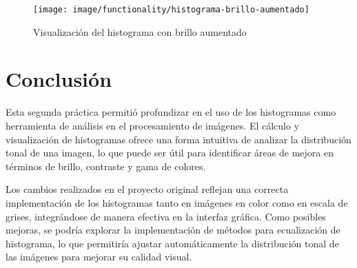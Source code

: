 \documentclass{report}
\begin{document}
  \begin{figure}[H]
    \centering
    \texttt{[image: image/functionality/histograma-brillo-aumentado]}
    \caption{Visualización del histograma con brillo aumentado}\label{fig:histograma-brillo-aumentado}
  \end{figure}

  \chapter{Conclusión}\label{ch:conclusion}
  Esta segunda práctica permitió profundizar en el uso de los histogramas como herramienta de análisis en el procesamiento de imágenes.
  El cálculo y visualización de histogramas ofrece una forma intuitiva de analizar la distribución tonal de una imagen, lo que puede ser útil para identificar áreas de mejora en términos de brillo, contraste y gama de colores.

  Los cambios realizados en el proyecto original reflejan una correcta implementación de los histogramas tanto en imágenes en color como en escala de grises, integrándose de manera efectiva en la interfaz gráfica.
  Como posibles mejoras, se podría explorar la implementación de métodos para ecualización de histograma, lo que permitiría ajustar automáticamente la distribución tonal de las imágenes para mejorar su calidad visual.
\end{document}
